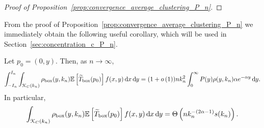 \begin{proof}[Proof of Proposition~\ref{prop:convergence_average_clustering_P_n}]
\end{proof}

From the proof of Proposition~\ref{prop:convergence_average_clustering_P_n} we immediately obtain the following useful corollary, which will be used in Section~\ref{sec:concentration_c_P_n}. 

\begin{corollary}\label{cor:adjusted_triangle_counting_P_n}
Let $p_0 = (0,y)$. Then, as $n \to \infty$,
\[
	\int_{-I_n}^{I_n}\int_{{\mathcal K}_{C}(k_n)} \rho_{\text{box}}(y,k_n) \mathbb{E}\left[\widetilde{T}_{\text{box}}(p_0)\right] f(x,y) \operatorname{\mathrm{d}\hspace{-2pt}} x \operatorname{\mathrm{d}\hspace{-2pt}} y
	= (1+o\left(1\right)) n k_n^2 \int_0^\infty P(y) \rho(y,k_n) \alpha e^{-\alpha y} \operatorname{\mathrm{d}\hspace{-2pt}} y. 
\]
In particular,
\[
	\int_{{\mathcal K}_{C}(k_n)} \rho_{\text{box}}(y,k_n) \mathbb{E}\left[\widetilde{T}_{\text{box}}(p_0)\right] f(x,y) \operatorname{\mathrm{d}\hspace{-2pt}} x \operatorname{\mathrm{d}\hspace{-2pt}} y
	= \Theta\left(n k_n^{-(2\alpha - 1)} s(k_n)\right).
\]
\end{corollary}

